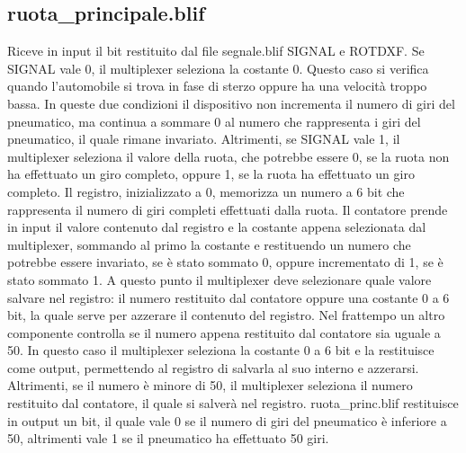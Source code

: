 \documentclass[a4paper,titlepage]{book}
\begin{document}
\subsection{ruota\_principale.blif}
Riceve in input il bit restituito dal file segnale.blif SIGNAL e ROTDXF.  Se SIGNAL vale 0, il multiplexer seleziona la costante 0. Questo caso si verifica quando  l'automobile si trova in fase di sterzo oppure ha una velocità troppo bassa. In queste due  condizioni il dispositivo non incrementa il numero di giri del pneumatico, ma continua a  sommare 0 al numero che rappresenta i giri del pneumatico, il quale rimane invariato.  Altrimenti, se SIGNAL vale 1, il multiplexer seleziona il valore della ruota, che potrebbe  essere 0, se la ruota non ha effettuato un giro completo, oppure 1, se la ruota ha  effettuato un giro completo.  Il registro, inizializzato a 0, memorizza un numero a 6 bit che rappresenta il numero di giri  completi effettuati dalla ruota.  Il contatore prende in input il valore contenuto dal registro e la costante appena  selezionata dal multiplexer, sommando al primo la costante e restituendo un numero che  potrebbe essere invariato, se è stato sommato 0, oppure incrementato di 1, se è stato  sommato 1.  A questo punto il multiplexer deve selezionare quale valore salvare nel registro: il numero  restituito dal contatore oppure una costante 0 a 6 bit, la quale serve per azzerare il  contenuto del registro.  Nel frattempo un altro componente controlla se il numero appena restituito dal contatore  sia uguale a 50. In questo caso il multiplexer seleziona la costante 0 a 6 bit e la restituisce  come output, permettendo al registro di salvarla al suo interno e azzerarsi. Altrimenti, se il  numero è minore di 50, il multiplexer seleziona il numero restituito dal contatore, il quale si  salverà nel registro.  ruota\_princ.blif restituisce in output un bit, il quale vale 0 se il numero di giri del  pneumatico è inferiore a 50, altrimenti vale 1 se il pneumatico ha effettuato 50 giri.
\end{document}
